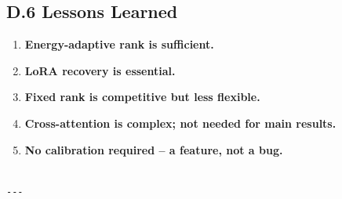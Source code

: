 \subsection{D.6 Lessons Learned}

\begin{enumerate}
\item \textbf{Energy-adaptive rank is sufficient.}
\item \textbf{LoRA recovery is essential.}
\item \textbf{Fixed rank is competitive but less flexible.}
\item \textbf{Cross-attention is complex; not needed for main results.}
\item \textbf{No calibration required -- a feature, not a bug.}
\end{enumerate}
\begin{lstlisting}

---
\end{lstlisting}